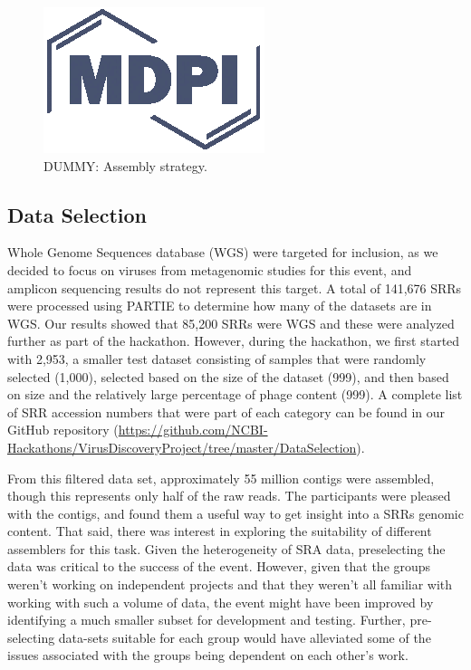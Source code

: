   \begin{figure}
    \centering
    \includegraphics{Definitions/logo-mdpi}
    \caption{DUMMY: Assembly strategy.
            \label{fig:asm_strategy}}
  \end{figure}

  \subsection{Data Selection}
  Whole Genome Sequences database (WGS) were  targeted for inclusion, as we
  decided to focus on viruses from metagenomic studies for this event, and
  amplicon sequencing results do not represent this target. A total of 141,676
  SRRs were processed using PARTIE \cite{Torres2017} to determine how many of
  the datasets are in WGS. Our results showed that 85,200 SRRs were WGS and
  these were analyzed further as part of the hackathon. However, during the
  hackathon, we first started with 2,953, a smaller test dataset consisting of
  samples that were randomly selected (1,000), selected based on the size of
  the dataset (999), and then based on size and the relatively large percentage
  of phage content (999). A complete list of SRR accession numbers that were
  part of each category can be found in our GitHub repository
  (\url{https://github.com/NCBI-Hackathons/VirusDiscoveryProject/tree/master/DataSelection}).

  From this filtered data set, approximately 55 million contigs were assembled,
  though this represents only half of the raw reads. The participants were
  pleased with the contigs, and found them a useful way to get insight into a
  SRRs genomic content. That said, there was interest in exploring the
  suitability of different assemblers for this task. Given the heterogeneity of
  SRA data, preselecting the data was critical to the success of the event.
  However, given that the groups weren't working on independent projects and
  that they weren't all familiar with working with such a volume of data, the
  event might have been improved by identifying a much smaller subset for
  development and testing. Further, pre-selecting data-sets suitable for each
  group would have alleviated some of the issues associated with the groups
  being dependent on each other's work.

